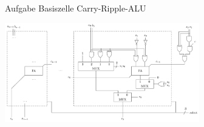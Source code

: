 \begin{frame}[allowframebreaks]{Aufgabe \thesection}{Basiszelle Carry-Ripple-ALU}
\begin{solutionnoinc}
    \center\includegraphics[width=240pt]{figures/CR-ALU-Cell.png}
\end{solutionnoinc}

\end{frame}
